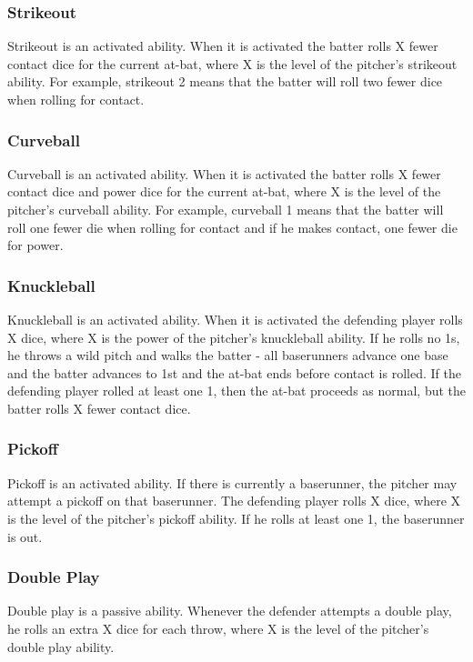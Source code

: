 \documentclass[12pt]{article} %
\begin{document}
\subsubsection{Strikeout}
Strikeout is an activated ability.  When it is activated the batter rolls X fewer contact dice for the current at-bat, where X is the level of the pitcher's strikeout ability.  For example, strikeout 2 means that the batter will roll two fewer dice when rolling for contact. 

\subsubsection{Curveball}
Curveball is an activated ability.  When it is activated the batter rolls X fewer contact dice and power dice for the current at-bat, where X is the level of the pitcher's curveball ability.  For example, curveball 1 means that the batter will roll one fewer die when rolling for contact and if he makes contact, one fewer die for power.

\subsubsection{Knuckleball}
Knuckleball is an activated ability.  When it is activated the defending player rolls X dice, where X is the power of the pitcher's knuckleball ability.  If he rolls no 1s, he throws a wild pitch and walks the batter - all baserunners advance one base and the batter advances to 1st and the at-bat ends before contact is rolled.  If the defending player rolled at least one 1, then the at-bat proceeds as normal, but the batter rolls X fewer contact dice.  

\subsubsection{Pickoff}
Pickoff is an activated ability.  If there is currently a baserunner, the pitcher may attempt a pickoff on that baserunner.  The defending player rolls X dice, where X is the level of the pitcher's pickoff ability.  If he rolls at least one 1, the baserunner is out.

\subsubsection{Double Play}
Double play is a passive ability.  Whenever the defender attempts a double play, he rolls an extra X dice for each throw, where X is the level of the pitcher's double play ability.
\end{document}
